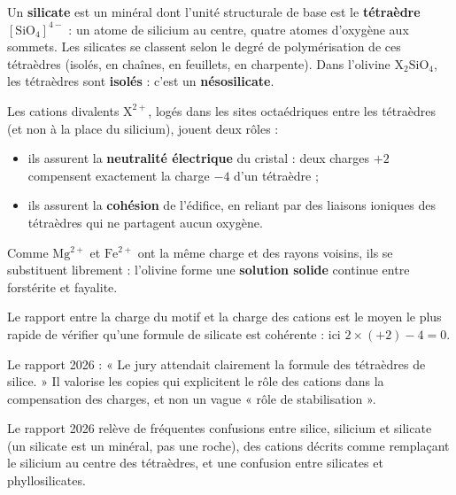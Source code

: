\documentclass[11pt,a4paper]{article}
\providecommand{\tightlist}{\setlength{\itemsep}{0pt}\setlength{\parskip}{0pt}}
\begin{document}
Un \textbf{silicate} est un minéral dont l'unité structurale de base est le \textbf{tétraèdre \([\mathrm{SiO_4}]^{4-}\)} : un atome de silicium au centre, quatre atomes d'oxygène aux sommets. Les silicates se classent selon le degré de polymérisation de ces tétraèdres (isolés, en chaînes, en feuillets, en charpente). Dans l'olivine \(\mathrm{X_2SiO_4}\), les tétraèdres sont \textbf{isolés} : c'est un \textbf{nésosilicate}.

Les cations divalents \(\mathrm{X^{2+}}\), logés dans les sites octaédriques entre les tétraèdres (et non à la place du silicium), jouent deux rôles :

\begin{itemize}
\tightlist
\item
  ils assurent la \textbf{neutralité électrique} du cristal : deux charges \(+2\) compensent exactement la charge \(-4\) d'un tétraèdre ;
\item
  ils assurent la \textbf{cohésion} de l'édifice, en reliant par des liaisons ioniques des tétraèdres qui ne partagent aucun oxygène.
\end{itemize}

Comme \(\mathrm{Mg^{2+}}\) et \(\mathrm{Fe^{2+}}\) ont la même charge et des rayons voisins, ils se substituent librement : l'olivine forme une \textbf{solution solide} continue entre forstérite et fayalite.

\begin{methode}

Le rapport entre la charge du motif et la charge des cations est le moyen le plus rapide de vérifier qu'une formule de silicate est cohérente : ici \(2 \times (+2) - 4 = 0\).

\end{methode}

\begin{jury}

Le rapport 2026 : « Le jury attendait clairement la formule des tétraèdres de silice. » Il valorise les copies qui explicitent le rôle des cations dans la compensation des charges, et non un vague « rôle de stabilisation ».

\end{jury}

\begin{piege}

Le rapport 2026 relève de fréquentes confusions entre silice, silicium et silicate (un silicate est un minéral, pas une roche), des cations décrits comme remplaçant le silicium au centre des tétraèdres, et une confusion entre silicates et phyllosilicates.

\end{piege}
\end{document}
